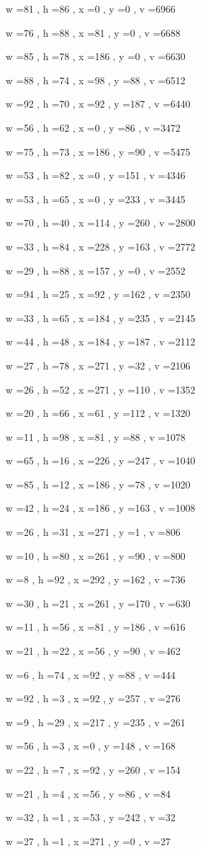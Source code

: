 \documentclass[11pt]{article}
\begin{document}
w =81 , h =86 , x =0 , y =0 , v =6966
\par
w =76 , h =88 , x =81 , y =0 , v =6688
\par
w =85 , h =78 , x =186 , y =0 , v =6630
\par
w =88 , h =74 , x =98 , y =88 , v =6512
\par
w =92 , h =70 , x =92 , y =187 , v =6440
\par
w =56 , h =62 , x =0 , y =86 , v =3472
\par
w =75 , h =73 , x =186 , y =90 , v =5475
\par
w =53 , h =82 , x =0 , y =151 , v =4346
\par
w =53 , h =65 , x =0 , y =233 , v =3445
\par
w =70 , h =40 , x =114 , y =260 , v =2800
\par
w =33 , h =84 , x =228 , y =163 , v =2772
\par
w =29 , h =88 , x =157 , y =0 , v =2552
\par
w =94 , h =25 , x =92 , y =162 , v =2350
\par
w =33 , h =65 , x =184 , y =235 , v =2145
\par
w =44 , h =48 , x =184 , y =187 , v =2112
\par
w =27 , h =78 , x =271 , y =32 , v =2106
\par
w =26 , h =52 , x =271 , y =110 , v =1352
\par
w =20 , h =66 , x =61 , y =112 , v =1320
\par
w =11 , h =98 , x =81 , y =88 , v =1078
\par
w =65 , h =16 , x =226 , y =247 , v =1040
\par
w =85 , h =12 , x =186 , y =78 , v =1020
\par
w =42 , h =24 , x =186 , y =163 , v =1008
\par
w =26 , h =31 , x =271 , y =1 , v =806
\par
w =10 , h =80 , x =261 , y =90 , v =800
\par
w =8 , h =92 , x =292 , y =162 , v =736
\par
w =30 , h =21 , x =261 , y =170 , v =630
\par
w =11 , h =56 , x =81 , y =186 , v =616
\par
w =21 , h =22 , x =56 , y =90 , v =462
\par
w =6 , h =74 , x =92 , y =88 , v =444
\par
w =92 , h =3 , x =92 , y =257 , v =276
\par
w =9 , h =29 , x =217 , y =235 , v =261
\par
w =56 , h =3 , x =0 , y =148 , v =168
\par
w =22 , h =7 , x =92 , y =260 , v =154
\par
w =21 , h =4 , x =56 , y =86 , v =84
\par
w =32 , h =1 , x =53 , y =242 , v =32
\par
w =27 , h =1 , x =271 , y =0 , v =27
\par
\newpage
\end{document}
